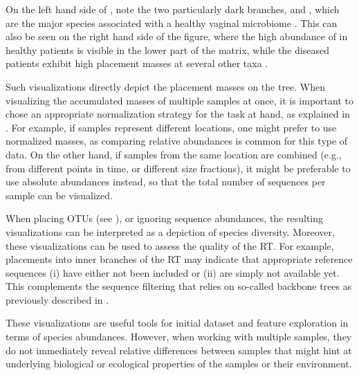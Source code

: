 On the left hand side of , note the two particularly dark branches, 
 and ,
which are the major species associated with a healthy vaginal microbiome \cite{Srinivasan2012}.
This can also be seen on the right hand side of the figure,
where the high abundance of  in healthy patients
is visible in the lower part of the matrix,
while the diseased patients exhibit high placement masses at several other taxa \cite{Srinivasan2012}.

Such visualizations directly depict the placement masses on the tree.
When visualizing the accumulated masses of multiple samples at once,
it is important to chose an appropriate normalization strategy for the task at hand,
as explained in .
For example, if samples represent different locations, one might prefer to use normalized masses,
as comparing relative abundances is common for this type of data.
On the other hand, if samples from the same location are combined
(e.g., from different points in time, or different size fractions),
it might be preferable to use absolute abundances instead,
so that the total number of sequences per sample can be visualized.

When placing OTUs (see ),
or ignoring sequence abundances, the resulting visualizations can be interpreted as a depiction of species diversity.
Moreover, these visualizations can be used to assess the quality of the \ac{RT}.
For example, placements into inner branches of the \ac{RT} may indicate that appropriate reference sequences
(i) have either not been included or (ii) are simply not available yet.
This complements the sequence filtering that relies on so-called backbone trees
as previously described in .

These visualizations are useful tools for initial dataset and feature exploration in terms of species abundances.
However, when working with multiple samples,
they do not immediately reveal relative differences between samples
that might hint at underlying biological or ecological properties of the samples or their environment.

